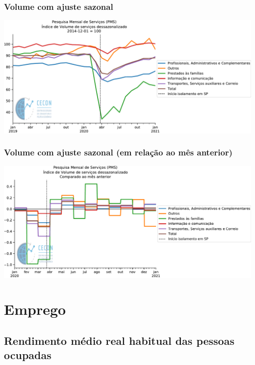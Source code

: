 \documentclass{SelfArx}
\begin{document}
\subsubsection*{Volume com ajuste sazonal}
\label{sec:org507c535}


\begin{center}
\includegraphics[width=.9\linewidth]{./figs/Setoriais/PMS_vol_dessazonalizada.pdf}
\end{center}

\subsubsection*{Volume com ajuste sazonal (em relação ao mês anterior)}
\label{sec:org46e29a1}


\begin{center}
\includegraphics[width=.9\linewidth]{./figs/Setoriais/PMS_vol_dessazonalizada_diff.pdf}
\end{center}

\section*{Emprego}
\label{sec:org2711747}

\subsection*{Rendimento médio real habitual das pessoas ocupadas}
\label{sec:org94c7664}
\end{document}
